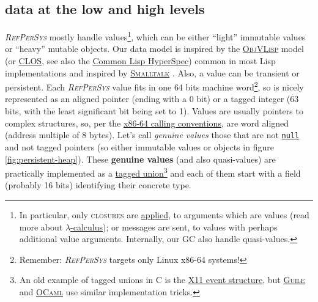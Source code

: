 \documentclass[11pt,a4paper,svgnames]{article}
\newcommand{\RefPerSys}{{\textit{\textsc{RefPerSys}}}}
\begin{document}
\subsection{data at the low and high levels}

{\RefPerSys} mostly handle values\footnote{In particular, only
\textsc{closures} are
\href{https://en.wikipedia.org/wiki/Function_application}{applied}, to
arguments which are values (read more about
\href{https://en.wikipedia.org/wiki/Lambda_calculus}{$\lambda$-calculus});
or messages are sent, to values with perhaps additional value
arguments. Internally, our GC also handle quasi-values.}, which can be
either ``light'' immutable values or ``heavy'' mutable objects. Our
data model is inspired by the
\href{https://en.wikipedia.org/wiki/ObjVlisp}{\textsc{ObjVLisp}} model
(or
\href{https://en.wikipedia.org/wiki/Common_Lisp_Object_System}{\textsc{CLOS}},
see also the
\href{http://www.lispworks.com/documentation/HyperSpec/Front/index.htm}{Common
  Lisp HyperSpec}) common in most Lisp implementations
\cite{queinnec:2003:lisp, cointe:1987:metaclasses, briot:1987:uniform}
and inspired by
\href{https://en.wikipedia.org/wiki/Smalltalk}{\textsc{Smalltalk}}
\cite{kay:1996:early-smalltalk}. Also, a value can be transient or
persistent. Each {\RefPerSys} value fits in one 64 bits machine
word\footnote{Remember: {\RefPerSys} targets only Linux x86-64
systems!}, so is nicely represented as an aligned pointer (ending with
a 0 bit) or a tagged integer (63 bits, with the least significant bit
being set to 1). Values are usually pointers to complex structures,
so, per the
\href{https://github.com/hjl-tools/x86-psABI/wiki/x86-64-psABI-1.0.pdf}{x86-64
  calling conventions}, are word aligned (address multiple of 8
bytes). Let's call \emph{genuine values}  those
that are not
\href{https://medium.com/@hinchman_amanda/null-pointer-references-the-billion-dollar-mistake-1e616534d485}{\texttt{null}}
and not tagged pointers (so either immutable values or objects in
figure \ref{fig:persistent-heap}). These \textbf{genuine values} (and
also quasi-values) are practically implemented as a \href{
  https://en.wikipedia.org/wiki/Tagged_union}{tagged
  union}\footnote{An old example of tagged unions in C is the
\href{https://tronche.com/gui/x/xlib/events/structures.html}{X11 event
  structure}, but
\href{https://www.gnu.org/software/guile/manual/html\_node/A-Simple-Representation.html}{\textsc{Guile}}
and
\href{https://caml.inria.fr/pub/docs/manual-ocaml/intfc.html}{\textsc{OCaml}}
use similar implementation tricks.} and each of them start with a
field (probably 16 bits) identifying their concrete type.
\end{document}
